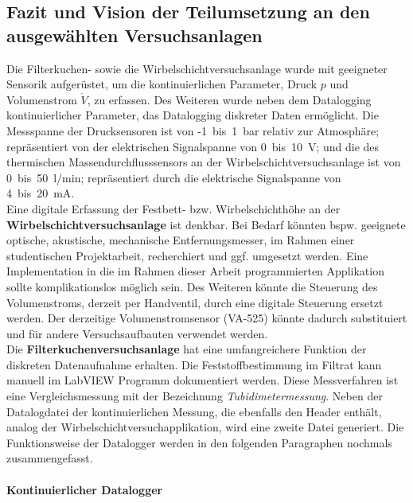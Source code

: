 \subsection{Fazit und Vision der Teilumsetzung an den ausgewählten Versuchsanlagen}


Die Filterkuchen- sowie die Wirbelschichtversuchsanlage wurde mit geeigneter Sensorik aufgerüstet, um die kontinuierlichen Parameter, Druck $p$ und Volumenstrom $\dot{V}$, zu erfassen. Des Weiteren wurde neben dem Datalogging kontinuierlicher Parameter, das Datalogging diskreter Daten ermöglicht. Die Messspanne der Drucksensoren ist von -1~bis~1~bar relativ zur Atmosphäre; repräsentiert von der elektrischen Signalspanne von 0~bis~10~V; und die des thermischen Massen\-durchfluss\-sensors an der Wirbel\-schicht\-versuchsanlage ist von 0~bis~50~l/min; repräsentiert durch die elektrische Signalspanne von 4~bis~20~mA.\\

Eine digitale Erfassung der Festbett- bzw. Wirbelschichthöhe an der \textbf{{\Hypatia Wirbelschichtversuchsanlage}} ist denkbar. Bei Bedarf könnten bspw. geeignete optische, akustische, mechanische Entfernungsmesser, im Rahmen einer studentischen Projektarbeit, recherchiert und ggf. umgesetzt werden. Eine Implementation in die im Rahmen dieser Arbeit programmierten Applikation sollte komplikationslos möglich sein. Des Weiteren könnte die Steuerung des Volumenstroms, derzeit per Handventil, durch eine digitale Steuerung ersetzt werden. Der derzeitige Volumenstromsensor (VA-525) könnte dadurch substituiert und für andere Versuchsaufbauten verwendet werden.\\

Die \textbf{{\Hypatia Filterkuchenversuchsanlage}} hat eine umfangreichere Funktion der diskreten Datenaufnahme erhalten. Die Feststoffbestimmung im Filtrat kann manuell im LabVIEW Programm dokumentiert werden. Diese Messverfahren ist eine Vergleichsmessung mit der Bezeichnung \textit{Tubidimetermessung}. Neben der Datalogdatei der kontinuierlichen Messung, 
die ebenfalls den Header enthält, analog der Wirbelschichtversuchapplikation, wird eine zweite Datei generiert. Die Funktionsweise der Datalogger werden in den folgenden Paragraphen nochmals zusammengefasst.


\paragraph*{Kontinuierlicher Datalogger} 

